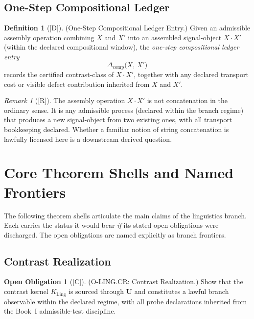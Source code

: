 \documentclass[12pt,oneside]{amsbook}
\theoremstyle{plain}
\theoremstyle{definition}
\newtheorem{definition}[theorem]{Definition}
\newtheorem{obligation}[theorem]{Open Obligation}
\theoremstyle{remark}
\newtheorem{remark}[theorem]{Remark}
\newcommand{\status}[1]{\textup{[#1]}}
\begin{document}
\subsection{One-Step Compositional Ledger}\label{sec:ling-one-step}

\begin{definition}[\status{D}]\label{def:ling-one-step-comp}
\textup{(One-Step Compositional Ledger Entry.)}
Given an admissible assembly operation combining $X$ and $X'$ into an
assembled signal-object $X \cdot X'$ (within the declared compositional
window), the \emph{one-step compositional ledger entry}
\[
 \Delta_{\mathrm{comp}}\!\bigl(X,\, X'\bigr)
\]
records the certified contrast-class of $X \cdot X'$, together with
any declared transport cost or visible defect contribution inherited
from $X$ and $X'$.
\end{definition}

\begin{remark}[\status{R}]\label{rem:ling-assembly-note}
The assembly operation $X \cdot X'$ is not concatenation in the
ordinary sense. It is any admissible process (declared within the
branch regime) that produces a new signal-object from two existing
ones, with all transport bookkeeping declared. Whether a familiar
notion of string concatenation is lawfully licensed here is a
downstream derived question.
\end{remark}

\section{Core Theorem Shells and Named Frontiers}
\label{sec:ling-theorems}

The following theorem shells articulate the main claims of the
linguistics branch. Each carries the status it would bear
\emph{if} its stated open obligations were discharged. The open
obligations are named explicitly as branch frontiers.

\subsection{Contrast Realization}\label{sec:ling-CR}

\begin{obligation}[\status{C}]\label{ob:ling-CR}
\textup{(O-LING.CR: Contrast Realization.)}
Show that the contrast kernel $K_{\mathrm{Ling}}$ is sourced through
$\mathbf{U}$ and constitutes a lawful branch observable within the
declared regime, with all probe declarations inherited from the
Book~I admissible-test discipline.
\end{obligation}
\end{document}
